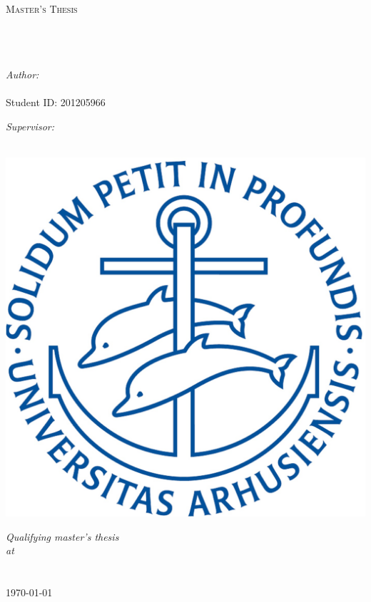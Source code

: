 \documentclass[11pt, twoside]{Thesis}
\begin{document}
\begin{titlepage}
\begin{center}

\textsc{\LARGE \univname}\\[1.5cm] %
\textsc{\Large Master's Thesis}\\[0.5cm] %

\HRule \\[0.4cm] %
{\huge \bfseries \ttitle}\\[0.4cm] %
\HRule \\[1.5cm] %
 
\begin{minipage}[t]{0.4\textwidth}
\begin{flushleft} \large
\emph{Author:}\\
{\authornames}\\ 
{Student ID: 201205966} %
\end{flushleft}
\end{minipage}%
\begin{minipage}[t]{0.4\textwidth}
\begin{flushright} \large
\emph{Supervisor:} \\
{\supname} %
\end{flushright}
\end{minipage}\\[0cm]
\vspace{3cm}
\includegraphics[width=0.4\columnwidth]{AU.jpg} 
 
\large \textit{Qualifying master's thesis}\\[0.1cm] %
\textit{at}\\[0.2cm]
\deptname \\ \facname \\[1cm] %


 
{\large \today} %

 
\vfill
\end{center}

\end{titlepage}
\end{document}
